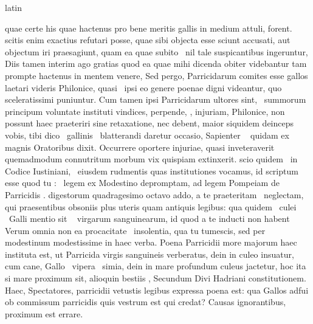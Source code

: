 \documentclass[12pt]{book}
\renewenvironment{latin}
    	{\begin{hyphenrules}{latin}}
    	{\end{hyphenrules}}
\begin{document}
\begin{pages}
\begin{latin}
\begin{Leftside}
                  quae certe his quae hactenus pro bene meritis gallis in medium attuli,  forent. 
                  scitis enim exactius refutari posse, quae sibi objecta esse sciunt accusati, aut objectum iri praesagiunt, quam ea quae subito  \ampersand\ nil tale suspicantibus ingeruntur, 
                  Diis tamen interim ago gratias quod ea quae mihi dicenda obiter videbantur tam prompte hactenus in mentem venere, Sed pergo, Parricidarum comites esse gallos laetari videris Philonice,
                  quasi  \ampersand\ ipsi eo genere poenae digni videantur, quo sceleratissimi puniuntur. Cum tamen ipsi Parricidarum ultores sint,  \ampersand\ summorum principum voluntate instituti vindices, perpende, 
                  , injuriam, Philonice, non possunt haec praeteriri sine retaxatione, nec debent, maior siquidem deinceps vobis, tibi dico
                   \ampersand\ gallinis   \ampersand\ blatterandi daretur occasio, Sapienter 
                   \ampersand\  quidam ex magnis Oratoribus dixit. Occurrere oportere injuriae, 
                  quasi inveteraverit quemadmodum connutritum morbum vix quispiam extinxerit. scio quidem  \ampersand\ in Codice Iustiniani,  \ampersand\ eiusdem rudmentis quas institutiones vocamus, id scriptum esse 
                  quod tu  :  \ampersand\ legem ex Modestino depromptam, ad legem Pompeiam de Parricidis . 
                  digestorum quadragesimo octavo addo, a te praeteritam  \ampersand\ neglectam, qui praesentibus obsoniis plus uteris quam antiquis legibus: qua quidem  \ampersand\ culei  \ampersand\ Galli mentio sit  \ampersand\
                   virgarum sanguinearum, id quod a te inducti non habent Verum omnia non ea procacitate  \ampersand\ insolentia, qua tu tumescis, 
                  sed per modestinum modestissime in haec verba. Poena Parricidii more majorum haec instituta est, ut Parricida virgis sanguineis verberatus, dein in culeo insuatur, 
                  cum cane, Gallo \edtext{Gallinaceo}{\Afootnote{Gallinacio}}  \ampersand\ vipera  \ampersand\ simia, dein in mare profundum culeus jactetur, 
                  hoc ita si mare proximum sit, alioquin bestiis \edtext{subiiciatur}{\Afootnote{subiciatur}}, Secundum Divi Hadriani constitutionem. 
                  Haec, Spectatores, parricidii vetustis legibus expressa poena est: qua Gallos adfui ob commissum parricidis quis vestrum est qui credat? Causas ignorantibus, proximum est errare.

\end{Leftside}
\end{latin}
\end{pages}
\end{document}
